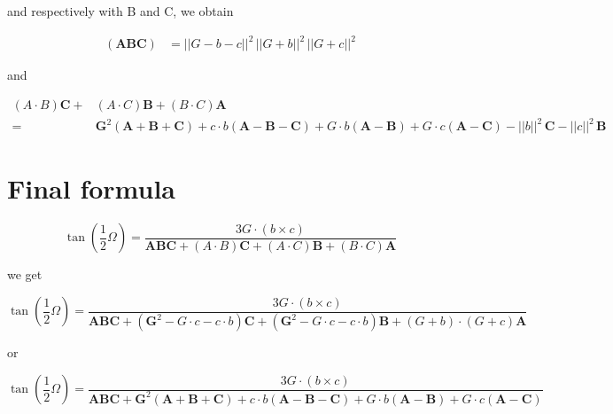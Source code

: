 \documentclass[10pt,a4paper]{article}
\begin{document}
and respectively with B and C, we obtain


\begin{align}
(\mathbf{A}\mathbf{B}\mathbf{C}) &= ||G-b-c||^2\,||G+b||^2\,||G+c||^2
\end{align}

and


\begin{align}
 \left({A}\cdot {B}\right)\mathbf{C}
  +& \left({A}\cdot {C}\right)\mathbf{B}
   +  \left({B}\cdot {C}\right)\mathbf{A} \\ \nonumber
	=& \mathbf{G}^2 (\mathbf{A} + \mathbf{B} + \mathbf{C})
	+ c \cdot b (\mathbf{A} - \mathbf{B} - \mathbf{C})
	 + G \cdot b (\mathbf{A} - \mathbf{B})
	  + G \cdot c (\mathbf{A} - \mathbf{C})
	  -  ||b||^2\, \mathbf{C} -  ||c||^2\, \mathbf{B}
\end{align}


\section{Final formula}


$$
{\displaystyle \tan \left({\frac {1}{2}}\Omega \right)
  = {\frac {3 G \cdot \left( b \times c \right)}
    {\mathbf{A}\mathbf{B}\mathbf{C} + \left({A}\cdot {B}\right)\mathbf{C}
      + \left({A}\cdot {C}\right)\mathbf{B}
      + \left({B}\cdot {C}\right)\mathbf{A}}}}
$$

we get

$$
{\displaystyle \tan \left({\frac {1}{2}}\Omega \right)
  = {\frac {3 G \cdot \left( b \times c \right)}
    {\mathbf{A}\mathbf{B}\mathbf{C} +
    (\mathbf{G}^2 - G \cdot c - c \cdot b)\mathbf{C}
      + (\mathbf{G}^2 - G \cdot c - c \cdot b)\mathbf{B}
      + \left( G + b \right) \cdot \left( G + c \right) \mathbf{A}
      }}}
$$

or

$$
{\displaystyle \tan \left({\frac {1}{2}}\Omega \right)
  = {\frac {3 G \cdot \left( b \times c \right)}
    {\mathbf{A}\mathbf{B}\mathbf{C} +
    \mathbf{G}^2 (\mathbf{A} + \mathbf{B} + \mathbf{C})
	+ c \cdot b (\mathbf{A} - \mathbf{B} - \mathbf{C})
	 + G \cdot b (\mathbf{A} - \mathbf{B})
	  + G \cdot c (\mathbf{A} - \mathbf{C})
      }}}
$$
\end{document}
